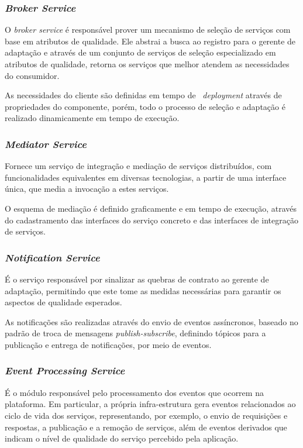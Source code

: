 \subsubsection{\textit{Broker Service}}
O \textit{broker service} é responsável prover um mecanismo de seleção de serviços com base em atributos de qualidade. Ele abstrai a busca ao registro para o gerente de adaptação e através de um conjunto de serviços de seleção especializado em atributos de qualidade, retorna os serviços que melhor atendem as necessidades do consumidor.

As necessidades do cliente são definidas em tempo de ~\textit{deployment} através de propriedades do componente, porém, todo o processo de seleção e adaptação é realizado dinamicamente em tempo de execução. 


\subsubsection{\textit{Mediator Service}}
Fornece um serviço de integração e mediação de serviços distribuídos, com funcionalidades equivalentes em diversas tecnologias, a partir de uma interface única, que media a invocação a estes serviços. 

O esquema de mediação é definido graficamente e em tempo de execução, através do cadastramento das interfaces do serviço concreto e das interfaces de integração de serviços.

\subsubsection{\textit{Notification Service}}
É o serviço responsável por sinalizar as quebras de contrato ao gerente de adaptação, permitindo que este tome as medidas necessárias para garantir os aspectos de qualidade esperados. 

As notificações são realizadas através do envio de eventos assíncronos, baseado no padrão de troca de mensagens \textit{publish-subscribe}, definindo tópicos para a publicação e entrega de notificações, por meio de eventos.

\subsubsection{\textit{Event Processing Service}}
\label{subsec:cep}
É o módulo responsável pelo processamento dos eventos que ocorrem na plataforma. Em particular, a própria infra-estrutura gera eventos relacionados ao ciclo de vida dos serviços, representando, por exemplo, o envio de requisições e respostas, a publicação e a remoção de serviços, além de eventos derivados que indicam o nível de qualidade do serviço percebido pela aplicação.

